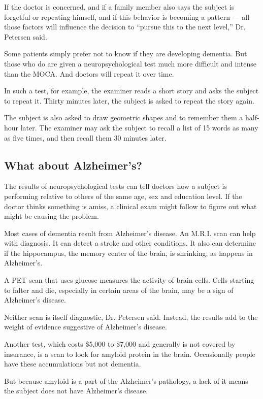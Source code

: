 If the doctor is concerned, and if a family member also says the subject
is forgetful or repeating himself, and if this behavior is becoming a
pattern --- all those factors will influence the decision to ``pursue
this to the next level,'' Dr. Petersen said.

Some patients simply prefer not to know if they are developing dementia.
But those who do are given a neuropsychological test much more difficult
and intense than the MOCA. And doctors will repeat it over time.

In such a test, for example, the examiner reads a short story and asks
the subject to repeat it. Thirty minutes later, the subject is asked to
repeat the story again.

The subject is also asked to draw geometric shapes and to remember them
a half-hour later. The examiner may ask the subject to recall a list of
15 words as many as five times, and then recall them 30 minutes later.

\hypertarget{what-about-alzheimers}{%
\subsection{What about Alzheimer's?}\label{what-about-alzheimers}}

The results of neuropsychological tests can tell doctors how a subject
is performing relative to others of the same age, sex and education
level. If the doctor thinks something is amiss, a clinical exam might
follow to figure out what might be causing the problem.

Most cases of dementia result from Alzheimer's disease. An M.R.I. scan
can help with diagnosis. It can detect a stroke and other conditions. It
also can determine if the hippocampus, the memory center of the brain,
is shrinking, as happens in Alzheimer's.

A PET scan that uses glucose measures the activity of brain cells. Cells
starting to falter and die, especially in certain areas of the brain,
may be a sign of Alzheimer's disease.

Neither scan is itself diagnostic, Dr. Petersen said. Instead, the
results add to the weight of evidence suggestive of Alzheimer's disease.

Another test, which costs \$5,000 to \$7,000 and generally is not
covered by insurance, is a scan to look for amyloid protein in the
brain. Occasionally people have these accumulations but not dementia.

But because amyloid is a part of the Alzheimer's pathology, a lack of it
means the subject does not have Alzheimer's disease.

